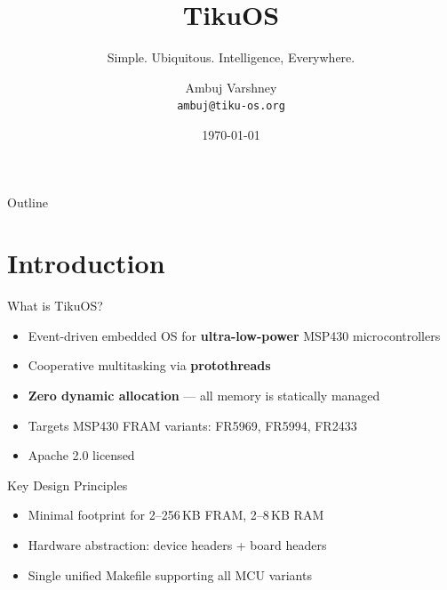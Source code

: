 \documentclass[aspectratio=169, 10pt]{beamer}
\title[TikuOS]{TikuOS}
\subtitle{Simple. Ubiquitous. Intelligence, Everywhere.}
\author[Ambuj Varshney]{Ambuj Varshney \\ \texttt{ambuj@tiku-os.org}}
\date{\today}
\begin{document}
\begin{frame}
\titlepage
\end{frame}

\begin{frame}{Outline}
\tableofcontents
\end{frame}

\section{Introduction}

\begin{frame}{What is TikuOS?}
\begin{itemize}
  \item Event-driven embedded OS for \textbf{ultra-low-power} MSP430 microcontrollers
  \item Cooperative multitasking via \textbf{protothreads}
  \item \textbf{Zero dynamic allocation} — all memory is statically managed
  \item Targets MSP430 FRAM variants: FR5969, FR5994, FR2433
  \item Apache 2.0 licensed
\end{itemize}

\vspace{0.5em}
\begin{block}{Key Design Principles}
\begin{itemize}
  \item Minimal footprint for 2--256\,KB FRAM, 2--8\,KB RAM
  \item Hardware abstraction: device headers + board headers
  \item Single unified Makefile supporting all MCU variants
\end{itemize}
\end{block}
\end{frame}
\end{document}
